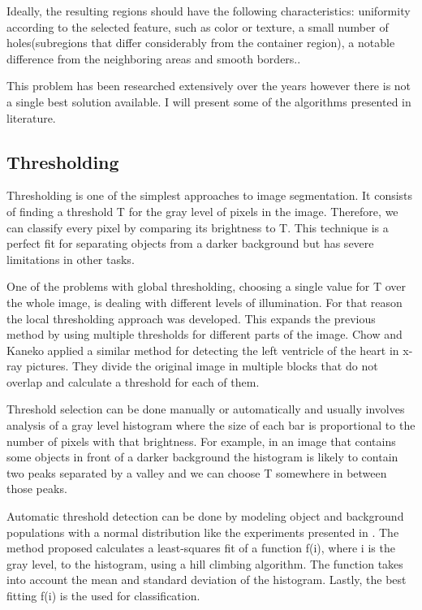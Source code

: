 \documentclass[12pt]{report}
\begin{document}
	Ideally, the resulting regions should have the following characteristics: uniformity according to the selected feature, such as color or texture, a small number of holes(subregions that differ considerably from the container region), a notable difference from the neighboring areas and smooth borders.\cite{computer_vision_book}.
	
	This problem has been researched extensively over the years however there is not a single best solution available. I will present some of the algorithms presented in literature.
	
	\subsection{Thresholding}
	Thresholding is one of the simplest approaches to image segmentation. It consists of finding a threshold T for the gray level of pixels in the image. Therefore, we can classify every pixel by comparing its brightness to T. This technique is a perfect fit for separating objects from a darker background but has severe limitations in other tasks\cite{image_segmentation_techniques}.
	
	One of the problems with global thresholding, choosing a single value for T over the whole image, is dealing with different levels of illumination. For that reason the local thresholding approach was developed. This expands the previous method by using multiple thresholds for different parts of the image. Chow and Kaneko \cite{segmentation_thresh_multiple} applied a similar method for detecting the left ventricle of the heart in x-ray pictures. They divide the original image in multiple blocks that do not overlap and calculate a threshold for each of them.
	
	Threshold selection can be done manually or automatically and usually involves analysis of a gray level histogram where the size of each bar is proportional to the number of pixels with that brightness\cite{review_on_image_segm_tech}. For example, in an image that contains some objects in front of a darker background the histogram is likely to contain two peaks separated by a valley and we can choose T somewhere in between those peaks. 
	
	Automatic threshold detection can be done by modeling object and background populations with a normal distribution like the experiments presented in \cite{experiments_on_thresholding}. The method proposed calculates a least-squares fit of a function f(i), where i is the gray level, to the histogram, using a hill climbing algorithm. The function takes into account the mean and standard deviation of the histogram. Lastly, the best fitting f(i) is the used for classification.
	
\end{document}
